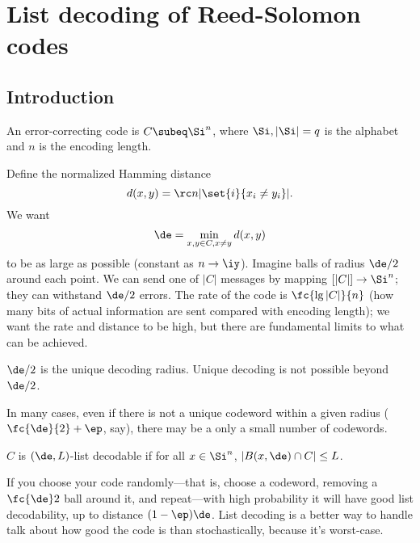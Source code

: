 \def\filepath{C:/Users/Owner/Dropbox/Math/templates}





%


%

\pagestyle{fancy}
\chead{} 
\rhead{} 
\lfoot{} 
\cfoot{\thepage} 
\rfoot{} 
\renewcommand{\headrulewidth}{.3pt} 
\setlength\voffset{0in}
\setlength\textheight{648pt}


\tableofcontents
\section{List decoding of Reed-Solomon codes}
\subsection{Introduction}
An error-correcting code is $C\subeq \Si^n$, where $\Si,|\Si|=q$ is the alphabet and $n$ is the encoding length. 

Define the normalized Hamming distance
\[
d(x,y)=\rc n|\set{i}{x_i\ne y_i}|.
\]
We want 
\[
\de = \min_{x,y\in C,x\ne y} d(x,y)
\]
to be as large as possible (constant as $n\to \iy$). Imagine balls of radius $\de/2$ around each point.
We can send one of $|C|$ messages by mapping $[|C|]\to \Si^n$; they can withstand $\de/2$ errors. The rate of the code is $\fc{\lg|C|}{n}$ (how many bits of actual information are sent compared with encoding length); we want the rate and distance to be high, but there are fundamental limits to what can be achieved.

$\de/2$ is the unique decoding radius. Unique decoding is not possible beyond $\de/2$. %

In many cases, even if there is not a unique codeword within a given radius ($\fc{\de}{2}+\ep$, say), there may be a only a small number of codewords.
\begin{df}
$C$ is $(\de,L)$-list decodable if for all $x\in \Si^n$, $|B(x,\de)\cap C|\le L$.
\end{df}
If you choose your code randomly---that is, choose a codeword, removing a $\fc{\de}2$ ball around it, and repeat---with high probability it will have good list decodability, up to distance $(1-\ep)\de$. %
List decoding is a better way to handle talk about how good the code is than stochastically, because it's worst-case.

